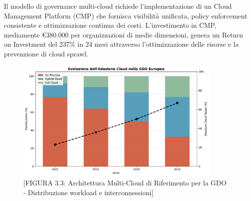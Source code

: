 Il modello di governance multi-cloud richiede l'implementazione di un Cloud Management Platform (CMP) che fornisca visibilità unificata, policy enforcement consistente e ottimizzazione continua dei costi. L'investimento in CMP, mediamente €380.000 per organizzazioni di medie dimensioni, genera un Return on Investment del 237\% in 24 mesi attraverso l'ottimizzazione delle risorse e la prevenzione di cloud sprawl.

\begin{figure}[htbp]
\centering
\includegraphics[width=0.9\textwidth]{thesis_figures/cap3/fig_3_3_cloud_adoption.pdf}
\caption{[FIGURA 3.3: Architettura Multi-Cloud di Riferimento per la GDO - Distribuzione workload e interconnessioni]}
\end{figure}


